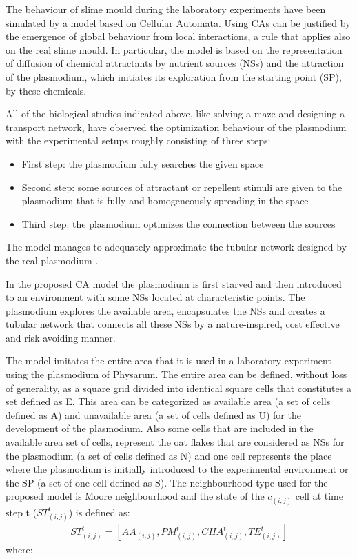 The behaviour of slime mould during the laboratory experiments have been simulated by a model based on Cellular Automata. Using CAs can be justified by the emergence of global behaviour from local interactions, a rule that applies also on the real slime mould.
In particular, the model is based on the representation of diffusion of chemical attractants by nutrient sources (NSs) and the attraction of the plasmodium, which initiates its exploration from the starting point (SP), by these chemicals. 
\par
All of the biological studies indicated above, like solving a maze and designing a transport network, have observed the optimization behaviour of the plasmodium with the experimental setups roughly consisting of three steps:
\begin{itemize}
\item First step: the plasmodium fully searches the given space
\item Second step: some sources of attractant or repellent stimuli are given to the plasmodium that is fully and homogeneously spreading in the space
\item Third step: the plasmodium optimizes the connection between the sources
\end{itemize}

The model manages to adequately approximate the tubular network designed by the real plasmodium \cite{shirakawa2015construction}.

In the proposed CA model \cite{Tsompanas2016} the plasmodium is first starved and then introduced to an environment with some NSs located at characteristic points. The plasmodium explores the available area, encapsulates the NSs and creates a tubular network that connects all these NSs by a nature-inspired, cost effective and risk avoiding manner.
\par
The model imitates the entire area that it is used in a laboratory experiment using the plasmodium of Physarum. The entire area can be defined, without loss of generality, as a square grid divided into identical square cells that constitutes a set defined as E. This area can be categorized as available area (a set of cells defined as A) and unavailable area (a set of cells defined as U) for the development of the plasmodium.
Also some cells that are included in the available area set of cells, represent the oat flakes that are considered as NSs for the plasmodium (a set of cells defined as N) and one cell represents the place where the plasmodium is initially introduced to the
experimental environment or the SP (a set of one cell defined as S). 
The neighbourhood type used for the proposed model is Moore neighbourhood and the state of the $c_{(i, j)}$ cell at time step t ($ ST^t_{(i, j)}$) is defined as:
\begin{align}
ST^t_{(i, j)} = [AA_{(i, j)}, PM^t_{(i, j)}, CHA^t_{(i, j)}, TE^t_{(i, j)}]
\end{align}
where:

